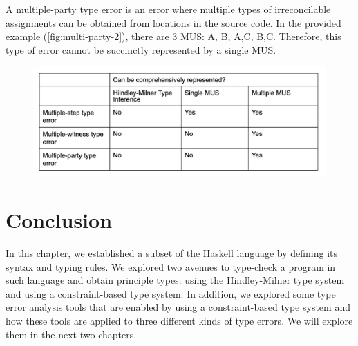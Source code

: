 A multiple-party type error is an error where multiple types of irreconcilable assignments can be obtained from locations in the source code. In the provided example  (\ref{fig:multi-party-2}), there are 3 MUS: {A, B}, {A,C}, {B,C}. Therefore, this type of error cannot be succinctly represented by a single MUS.

\begin{figure}[hbt]
  
  \includegraphics[width=\linewidth]{Compare}
  \caption{}
\end{figure}

\section{Conclusion}
In this chapter, we established a subset of the Haskell language by defining its syntax and typing rules. We explored two avenues to type-check a program in such language and obtain principle types: using the Hindley-Milner type system and using a constraint-based type system. In addition, we explored some type error analysis tools that are enabled by using a constraint-based type system and how these tools are applied to three different kinds of type errors. We will explore them in the next two chapters.
